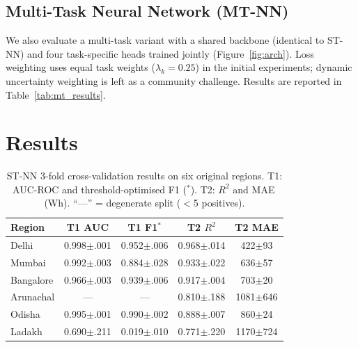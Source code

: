 \documentclass{article}
\theoremstyle{plain}
\theoremstyle{definition}
\begin{document}
\subsection{Multi-Task Neural Network (MT-NN)}

We also evaluate a multi-task variant with a shared backbone (identical to
ST-NN) and four task-specific heads trained jointly (Figure~\ref{fig:arch}).
Loss weighting uses equal task weights ($\lambda_k = 0.25$) in the initial
experiments; dynamic uncertainty weighting \citep{liu2019end} is left as a
community challenge.
Results are reported in Table~\ref{tab:mt_results}.

\section{Results}
\label{sec:results}

\begin{table}[t]
\caption{ST-NN 3-fold cross-validation results on six original regions.
  T1: AUC-ROC and threshold-optimised F1 ($^*$).
  T2: $R^2$ and MAE\,(Wh). ``---'' = degenerate split ($<$5 positives).}
\label{tab:st_results}
\vskip 0.1in
\begin{center}
\begin{small}
\begin{tabular}{lcccc}
\toprule
Region & T1 AUC & T1 F1$^*$ & T2 $R^2$ & T2 MAE \\
\midrule
Delhi      & 0.998$\pm$.001 & 0.952$\pm$.006 & 0.968$\pm$.014 & 422$\pm$93 \\
Mumbai     & 0.992$\pm$.003 & 0.884$\pm$.028 & 0.933$\pm$.022 & 636$\pm$57 \\
Bangalore  & 0.966$\pm$.003 & 0.939$\pm$.006 & 0.917$\pm$.004 & 703$\pm$20 \\
Arunachal  & ---            & ---            & 0.810$\pm$.188 & 1081$\pm$646 \\
Odisha     & 0.995$\pm$.001 & 0.990$\pm$.002 & 0.888$\pm$.007 & 860$\pm$24 \\
Ladakh     & 0.690$\pm$.211 & 0.019$\pm$.010 & 0.771$\pm$.220 & 1170$\pm$724 \\
\bottomrule
\end{tabular}
\end{small}
\end{center}
\vskip -0.1in
\end{table}
\end{document}
